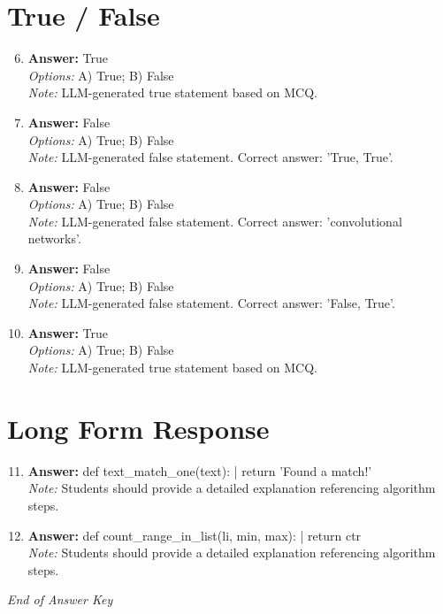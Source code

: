\documentclass[12pt]{article}
\begin{document}
\section*{True / False}
\begin{enumerate}[label=\arabic*.]
\setcounter{enumi}{5}
\item \textbf{Answer:} True
\\ \textit{Options:} A) True; B) False
\\ \textit{Note:} LLM-generated true statement based on MCQ.
\item \textbf{Answer:} False
\\ \textit{Options:} A) True; B) False
\\ \textit{Note:} LLM-generated false statement. Correct answer: 'True, True'.
\item \textbf{Answer:} False
\\ \textit{Options:} A) True; B) False
\\ \textit{Note:} LLM-generated false statement. Correct answer: 'convolutional networks'.
\item \textbf{Answer:} False
\\ \textit{Options:} A) True; B) False
\\ \textit{Note:} LLM-generated false statement. Correct answer: 'False, True'.
\item \textbf{Answer:} True
\\ \textit{Options:} A) True; B) False
\\ \textit{Note:} LLM-generated true statement based on MCQ.
\end{enumerate}

\section*{Long Form Response}
\begin{enumerate}[label=\arabic*.]
\setcounter{enumi}{10}
\item \textbf{Answer:} def text\_match\_one(text): | return 'Found a match!'
\\ \textit{Note:} Students should provide a detailed explanation referencing algorithm steps.
\item \textbf{Answer:} def count\_range\_in\_list(li, min, max): | return ctr
\\ \textit{Note:} Students should provide a detailed explanation referencing algorithm steps.
\end{enumerate}

\vfill
\noindent\textit{End of Answer Key}
\end{document}
